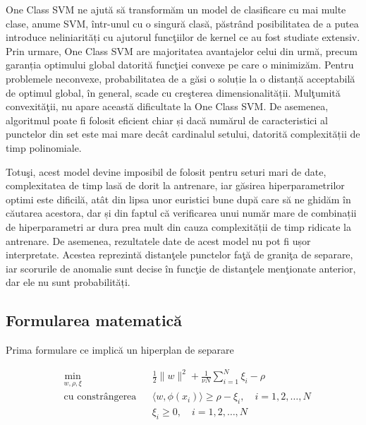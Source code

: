 One Class SVM ne ajută să transformăm un model de clasificare 
cu mai multe clase, anume SVM, într-unul cu o singură clasă,
păstrând posibilitatea de a putea introduce neliniarități 
cu ajutorul funcţiilor de kernel ce au fost studiate extensiv.
Prin urmare, One Class SVM are majoritatea avantajelor celui din urmă, precum
garanția optimului global datorită funcţiei convexe pe care
o minimizăm. Pentru problemele neconvexe, probabilitatea de 
a găsi o soluție la o distanță acceptabilă de optimul global, în general, 
scade cu creşterea dimensionalității. Mulţumită convexităţii, 
nu apare această dificultate la One Class SVM. De asemenea, 
algoritmul poate fi folosit eficient chiar și dacă 
numărul de caracteristici al punctelor din set este mai
mare decât cardinalul setului, datorită complexității de timp 
polinomiale.

Totuşi, acest model devine imposibil de folosit pentru 
seturi mari de date, complexitatea de timp lasă de dorit 
la antrenare, iar găsirea hiperparametrilor optimi este 
dificilă, atât din lipsa unor euristici bune după care 
să ne ghidăm în căutarea acestora, dar și din faptul că verificarea 
unui număr mare de combinații de hiperparametri  
ar dura prea mult din cauza complexității de timp ridicate 
la antrenare. De asemenea, rezultatele date de acest model 
nu pot fi ușor interpretate. Acestea reprezintă distanţele punctelor 
faţă de graniţa de separare, iar scorurile de anomalie sunt decise 
în funcţie de distanţele menţionate anterior, dar ele nu sunt probabilități.

\subsection{Formularea matematică}

Prima formulare ce implică un hiperplan de separare

\begin{equation}
    \begin{aligned}
    & \underset{w, \rho, \xi}{\text{min}}
    & & \frac{1}{2} \|w\|^2 + \frac{1}{\nu N} \sum_{i=1}^{N} \xi_i - \rho \\
    & \text{cu constrângerea}
    & & \langle w, \phi(x_i) \rangle \geq \rho - \xi_i, \quad i=1,2,\ldots,N \\
    &&& \xi_i \geq 0, \quad i=1,2,\ldots,N \\
    \end{aligned}
    \end{equation}
    

